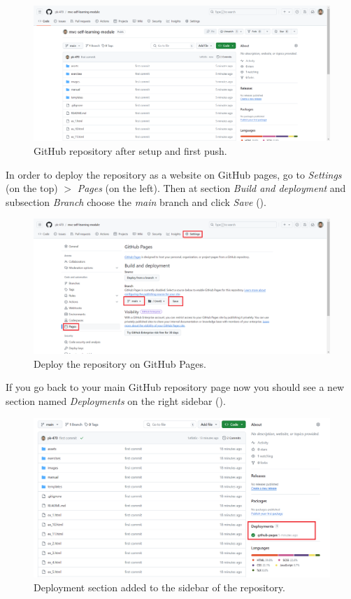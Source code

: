 \documentclass[a4paper,10pt]{article}
\begin{document}
\begin{figure}[htbp]
    \centering
    \includegraphics[width=\textwidth]{mvc_repository.png}
    \caption{GitHub repository after setup and first push.}
    \label{fig:mvc_repository}   
\end{figure}

In order to deploy the repository as a website on GitHub pages, go to \emph{Settings} (on the top) $>$ \emph{Pages} (on the left). Then at section \emph{Build and deployment} and subsection \emph{Branch} choose the \emph{main} branch and click \emph{Save} ().

\begin{figure}[htbp]
    \centering
    \includegraphics[width=\textwidth]{mvc_deploy.png}
    \caption{Deploy the repository on GitHub Pages.}
    \label{fig:mvc_deploy}   
\end{figure}

If you go back to your main GitHub repository page now you should see a new section named \emph{Deployments} on the right sidebar ().

\begin{figure}[htbp]
    \centering
    \includegraphics[width=\textwidth]{mvc_deployment_added.png}
    \caption{Deployment section added to the sidebar of the repository.}
    \label{fig:mvc_deployment_added}   
\end{figure}
\end{document}
